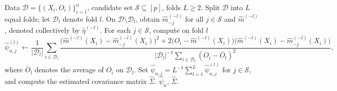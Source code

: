 \documentclass[12pt]{article}
\newcommand{\op}{\mathrm{op}}
\newcommand{\Ee}{{\mathbb{E}}}
\newcommand{\cD}{{\mathcal{D}}}   %
\newcommand{\cS}{{\mathcal{S}}}
\begin{document}
\begin{appendices}







\begin{algorithm}[tbp]
\caption{Cross-fitted Feature Importance Estimation}
\label{alg:feature.importance}
\begin{algorithmic}[1]
\Require Data $\cD=\{(X_i,O_i)\}_{i=1}^n$, candidate set $\cS\subseteq[p]$,         folds $L\ge2$.
\State Split $\cD$ into $L$ equal folds; let $\cD_l$ denote fold $l$.
  \State On $\cD\setminus\cD_l$, obtain $\widehat m_{-j}^{(-l)}$ for all 
         $j\in\cS$ and $\widehat m^{(-l)}$, denoted collectively by $\widehat{\eta}^{(-l)}$.
  \State For each $j\in\cS$, compute on fold $l$
  \[
  \widehat\psi_{n,j}^{(l)}
  \leftarrow
  \frac{1}{ |\cD_l|}\sum_{i\in\cD_l}
  \frac{
  \bigl(\widehat m^{(-l)}(X_i)-\widehat m_{-j}^{(-l)}(X_{i})\bigr)^2
  +
  2\bigl(O_i-\widehat m^{(-l)}(X_i)\bigr)
  \bigl(\widehat m^{(-l)}(X_i)-\widehat m_{-j}^{(-l)}(X_{i})\bigr)
  }{
  |\cD_l|^{-1}\sum_{i\in\cD_l}(O_i-\bar O_l)^2
  },
  \]
  where $\bar O_l$ denotes the average of $O_i$ on $\cD_l$. 
\EndFor
\State Set $\widehat\psi_{n,j}=L^{-1}\sum_{l=1}^L \widehat\psi_{n,j}^{(l)}$ for $j\in\cS$, and compute the estimated covariance matrix $\widehat\Sigma$.
\State \Return $\widehat\psi_n$, $\widehat\Sigma$.
\end{algorithmic}
\end{algorithm}


\end{appendices}
\end{document}
